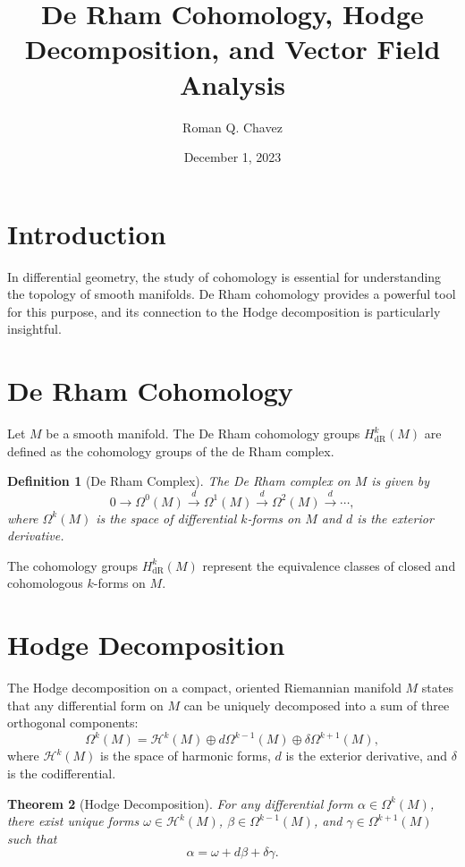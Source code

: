 \documentclass[12pt]{article}
\newtheorem{theorem}{Theorem}[section]
\newtheorem{definition}[theorem]{Definition}
\begin{document}
\title{De Rham Cohomology, Hodge Decomposition, and Vector Field Analysis}
\author{Roman Q. Chavez}
\date{December 1, 2023}
\maketitle

\section{Introduction}
In differential geometry, the study of cohomology is essential for understanding the topology of smooth manifolds. De Rham cohomology provides a powerful tool for this purpose, and its connection to the Hodge decomposition is particularly insightful.

\section{De Rham Cohomology}
Let $M$ be a smooth manifold. The De Rham cohomology groups $H^k_{\text{dR}}(M)$ are defined as the cohomology groups of the de Rham complex.

\begin{definition}[De Rham Complex]
The De Rham complex on $M$ is given by
\[
0 \rightarrow \Omega^0(M) \xrightarrow{d} \Omega^1(M) \xrightarrow{d} \Omega^2(M) \xrightarrow{d} \cdots,
\]
where $\Omega^k(M)$ is the space of differential $k$-forms on $M$ and $d$ is the exterior derivative.
\end{definition}

The cohomology groups $H^k_{\text{dR}}(M)$ represent the equivalence classes of closed and cohomologous $k$-forms on $M$.

\section{Hodge Decomposition}
The Hodge decomposition on a compact, oriented Riemannian manifold $M$ states that any differential form on $M$ can be uniquely decomposed into a sum of three orthogonal components:
\[
\Omega^k(M) = \mathcal{H}^k(M) \oplus d\Omega^{k-1}(M) \oplus \delta\Omega^{k+1}(M),
\]
where $\mathcal{H}^k(M)$ is the space of harmonic forms, $d$ is the exterior derivative, and $\delta$ is the codifferential.

\begin{theorem}[Hodge Decomposition]
For any differential form $\alpha \in \Omega^k(M)$, there exist unique forms $\omega \in \mathcal{H}^k(M)$, $\beta \in \Omega^{k-1}(M)$, and $\gamma \in \Omega^{k+1}(M)$ such that
\[
\alpha = \omega + d\beta + \delta\gamma.
\]
\end{theorem}
\end{document}
